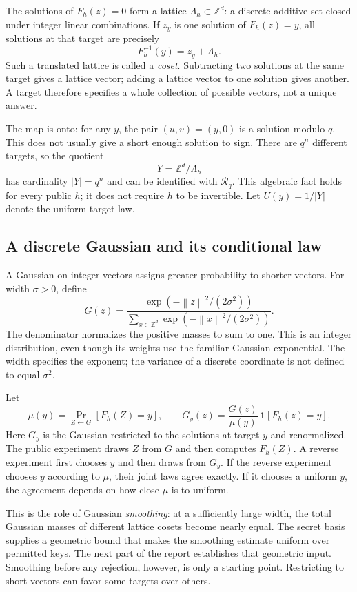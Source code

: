\documentclass[11pt,a4paper]{article}
\newcommand{\Z}{\mathbb Z}
\newcommand{\norm}[1]{\left\lVert#1\right\rVert}
\theoremstyle{definition}
\theoremstyle{remark}
\numberwithin{equation}{section}
\begin{document}
The solutions of $F_h(z)=0$ form a lattice
$\Lambda_h\subset\Z^d$: a discrete additive set closed under integer linear
combinations. If $z_y$ is one solution of $F_h(z)=y$, all solutions at that
target are precisely
\[
 F_h^{-1}(y)=z_y+\Lambda_h.
\]
Such a translated lattice is called a \emph{coset}. Subtracting two solutions
at the same target gives a lattice vector; adding a lattice vector to one
solution gives another. A target therefore specifies a whole collection of
possible vectors, not a unique answer.

The map is onto: for any $y$, the pair $(u,v)=(y,0)$ is a solution modulo
$q$. This does not usually give a short enough solution to sign. There are
$q^n$ different targets, so the quotient
\[
 Y=\Z^d/\Lambda_h
\]
has cardinality $|Y|=q^n$ and can be identified with $\mathcal R_q$.
This algebraic fact holds for every public $h$; it does not require $h$ to be
invertible. Let $U(y)=1/|Y|$ denote the uniform target law.

\subsection{A discrete Gaussian and its conditional law}

A Gaussian on integer vectors assigns greater probability to shorter vectors.
For width $\sigma>0$, define
\[
 G(z)=\frac{\exp(-\norm{z}^2/(2\sigma^2))}
 {\displaystyle\sum_{x\in\Z^d}\exp(-\norm{x}^2/(2\sigma^2))}.
\]
The denominator normalizes the positive masses to sum to one. This is an
integer distribution, even though its weights use the familiar Gaussian
exponential. The width specifies the exponent; the variance of a discrete
coordinate is not defined to equal $\sigma^2$.

Let
\[
 \mu(y)=\Pr_{Z\leftarrow G}[F_h(Z)=y],
 \qquad
 G_y(z)=\frac{G(z)}{\mu(y)}\,\mathbf{1}[F_h(z)=y].
\]
Here $G_y$ is the Gaussian restricted to the solutions at target $y$ and
renormalized. The public experiment draws $Z$ from $G$ and then computes
$F_h(Z)$. A reverse experiment first chooses $y$ and then draws from $G_y$.
If the reverse experiment chooses $y$ according to $\mu$, their joint laws
agree exactly. If it chooses a uniform $y$, the agreement depends on how close
$\mu$ is to uniform.

This is the role of Gaussian \emph{smoothing}: at a sufficiently large width,
the total Gaussian masses of different lattice cosets become nearly equal.
The secret basis supplies a geometric bound that makes the smoothing
estimate uniform over permitted keys.
The next part of the report establishes that geometric input. Smoothing before
any rejection, however, is only a starting point. Restricting to short vectors
can favor some targets over others.
\end{document}
